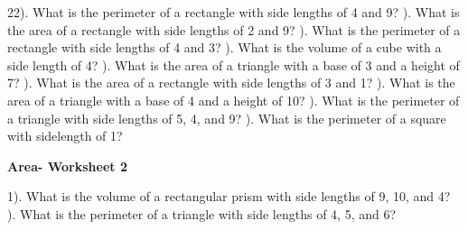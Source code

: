 \documentclass{article}%
\begin{document}
22). What is the perimeter of a rectangle with side lengths of 4 and 9?%
\newline%
\newline%
). What is the area of a rectangle with side lengths of 2 and 9?%
\newline%
\newline%
). What is the perimeter of a rectangle with side lengths of 4 and 3?%
\newline%
\newline%
). What is the volume of a cube with a side length of 4?%
\newline%
\newline%
). What is the area of a triangle with a base of 3 and a height of 7?%
\newline%
\newline%
). What is the area of a rectangle with side lengths of 3 and 1?%
\newline%
\newline%
). What is the area of a triangle with a base of 4 and a height of 10?%
\newline%
\newline%
). What is the perimeter of a triangle with side lengths of 5, 4, and 9?%
\newline%
\newline%
). What is the perimeter of a square with sidelength of 1?%
\newline%
\newline%
\newline%
\pagebreak%
\large%
\begin{center}%
\textbf{Area- Worksheet 2}%
\newline%
\end{center} \normalsize%
1). What is the volume of a rectangular prism with side lengths of 9, 10, and 4?%
\newline%
\newline%
). What is the perimeter of a triangle with side lengths of 4, 5, and 6?%
\newline%
\newline%
\end{document}
